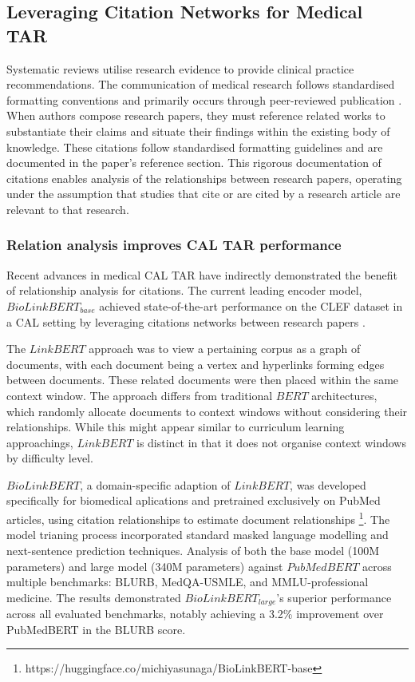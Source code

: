 \documentclass[10pt, english]{article}
\begin{document}
\subsection{Leveraging Citation Networks for Medical TAR}

Systematic reviews utilise research evidence to provide clinical practice recommendations. The communication of medical research follows standardised formatting conventions and primarily occurs through peer-reviewed publication \cite{BMCMedicalResearch}. When authors compose research papers, they must reference related works to substantiate their claims and situate their findings within the existing body of knowledge. These citations follow standardised formatting guidelines and are documented in the paper's reference section. This rigorous documentation of citations enables analysis of the relationships between research papers, operating under the assumption that studies that cite or are cited by a research article are relevant to that research.

\subsubsection{Relation analysis improves CAL TAR performance}

Recent advances in medical CAL TAR have indirectly demonstrated the benefit of relationship analysis for citations. The current leading encoder model, $BioLinkBERT_{base}$ achieved state-of-the-art performance on the CLEF dataset in a CAL setting by leveraging citations networks between research papers \cite{yasunaga2022linkbertpretraininglanguagemodels, goharian_reproducibility_2024}. 


The $LinkBERT$ approach was to view a pertaining corpus as a graph of documents, with each document being a vertex and hyperlinks forming edges between documents. These related documents were then placed within the same context window. The approach differs from traditional $BERT$ architectures, which randomly allocate documents to context windows without considering their relationships. While this might appear similar to curriculum learning approachings, $LinkBERT$ is distinct in that it does not organise context windows by difficulty level. 

$BioLinkBERT$, a domain-specific adaption of $LinkBERT$, was developed specifically for biomedical aplications and pretrained exclusively on PubMed articles, using citation relationships to estimate document relationships \footnote{https://huggingface.co/michiyasunaga/BioLinkBERT-base}. The model trianing process incorporated standard masked language modelling and next-sentence prediction techniques. Analysis of both the base model (100M parameters) and large model (340M parameters) against $PubMedBERT$ across multiple benchmarks:  BLURB\cite{guDomainSpecificLanguageModel2021}, MedQA-USMLE\cite{jinWhatDiseaseDoes2020}, and MMLU-professional medicine\cite{hendrycksMeasuringMassiveMultitask2021}. The results demonstrated $BioLinkBERT_{large}$'s superior performance across all evaluated benchmarks, notably achieving a 3.2\% improvement over PubMedBERT in the BLURB score.
\end{document}
